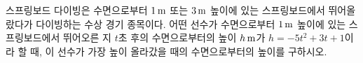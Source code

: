 스프링보드 다이빙은 수면으로부터 $1\mkern3mu \mathrm{m}$ 또는 $3\mkern3mu \mathrm{m}$ 높이에 있는 스프링보드에서 뛰어올랐다가 다이빙하는 수상 경기 종목이다. 어떤 선수가 수면으로부터 $1\mkern3mu \mathrm{m}$ 높이에 있는 스프링보드에서 뛰어오른 지 $t$초 후의 수면으로부터의 높이 $h\mkern3mu \mathrm{m}$가 $h=-5t^2+3t+1$이라 할 때, 이 선수가 가장 높이 올라갔을 때의 수면으로부터의 높이를 구하시오.
